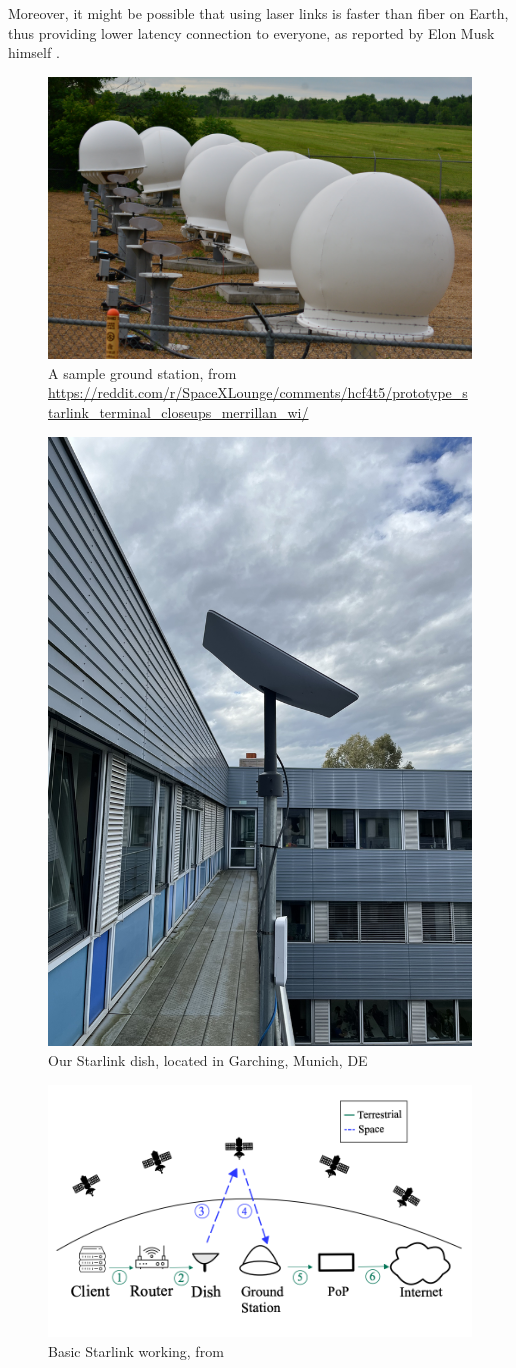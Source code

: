 \documentclass[IN,11pt,twoside,openright,idp,english]{tumthesis}
\begin{document}
Moreover, it might be possible that using laser links is faster than fiber on Earth, thus providing lower latency connection to everyone, as reported by Elon Musk himself \cite{tweet}.
    
\begin{figure}
    \centering
    \includegraphics[width=0.6\columnwidth]{img/ground-station.jpeg}
    \caption{A sample ground station, from \small\protect\url{https://reddit.com/r/SpaceXLounge/comments/hcf4t5/prototype_starlink_terminal_closeups_merrillan_wi/}}
    \label{fig:gs}
\end{figure}
    
\begin{figure}
    \centering
    \includegraphics[width=0.6\columnwidth]{img/dish.jpeg}
    \caption{Our Starlink dish, located in Garching, Munich, DE}
    \label{fig:dish}
\end{figure}
    
\begin{figure}
    \centering
    \includegraphics[width=0.6\columnwidth]{img/starlink-101.png}
    \caption{Basic Starlink working, from \cite{izhikevich2023democratizing}}
    \label{fig:starlink-101}
\end{figure}
    
\end{document}

